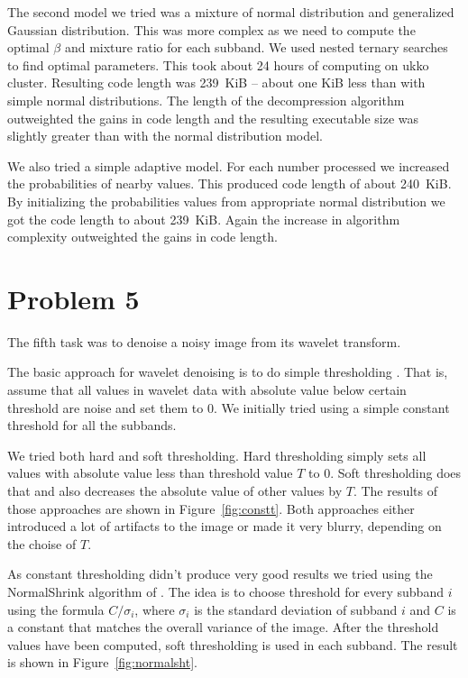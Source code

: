 \documentclass{article}
\begin{document}
The second model we tried was a mixture of normal distribution and generalized Gaussian distribution. This was more complex
as we need to compute the optimal $\beta$ and mixture ratio for each subband. We used nested ternary searches to find optimal parameters.
This took about 24 hours of computing on ukko cluster. Resulting code length was 239~KiB -- about one KiB less than with simple normal distributions.
The length of the decompression algorithm outweighted the gains in code length and the resulting executable size was slightly
greater than with the normal distribution model.

We also tried a simple adaptive model.
For each number processed we increased the probabilities of nearby values.
This produced code length of about 240~KiB.
By initializing the probabilities values from appropriate normal distribution we got the code length to about 239~KiB.
Again the increase in algorithm complexity outweighted the gains in code length.

\section{Problem 5}

The fifth task was to denoise a noisy image from its wavelet transform.

The basic approach for wavelet denoising is to do simple thresholding \cite{rvs02}. That is, assume that all values in wavelet data with absolute value below certain threshold are noise and set them to 0. We initially tried using a simple constant threshold for all the subbands.

We tried both hard and soft thresholding. Hard thresholding simply sets all values with absolute value less than threshold value $T$ to 0. Soft thresholding does that and also decreases the absolute value of other values by $T$. The results of those approaches are shown in Figure~\ref{fig:constt}. Both approaches either introduced a lot of artifacts to the image or made it very blurry, depending on the choise of $T$.

As constant thresholding didn't produce very good results we tried using the NormalShrink algorithm of \cite{ksc02}. The idea is to choose threshold for every subband $i$ using the formula $C/\sigma_i$, where $\sigma_i$ is the standard deviation of subband $i$ and $C$ is a constant that matches the overall variance of the image. After the threshold values have been computed, soft thresholding is used in each subband. The result is shown in Figure~\ref{fig:normalsht}.
\end{document}
